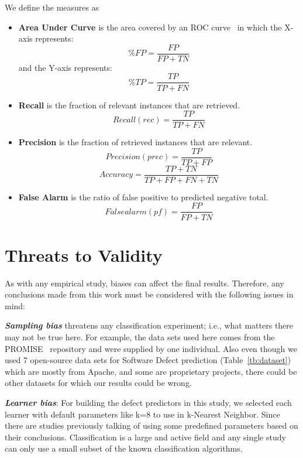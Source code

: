 \documentclass[sigconf,review, anonymous]{acmart}
\theoremstyle{break}
\begin{document}


We define the measures as
\begin{itemize}
\item \textbf{Area Under Curve} is the area covered by an ROC curve~\cite{swets1988measuring, duda2012pattern} in which the X-axis represents:
\[\%FP = \dfrac{FP}{FP + TN}\]
and the Y-axis represents:
\[\%TP = \dfrac{TP}{TP + FN}\]
\item \textbf{Recall}  is the fraction of relevant instances that are retrieved.
\[Recall(rec) = \dfrac{TP}{TP + FN}\]
\item \textbf{Precision} is the fraction of retrieved instances that are relevant.
\[Precision(prec) = \dfrac{TP}{TP + FP}\]
\[Accuracy = \dfrac{TP + TN}{TP + FP + FN + TN}\]
\item \textbf{False Alarm} is the ratio of false positive to predicted negative total.
\[False alarm(pf) = \dfrac{FP}{FP + TN}\]
\end{itemize}





\section{Threats to Validity}
\label{sect:validity}

As with any empirical study, biases can affect the final
results. Therefore, any conclusions made from this work must be considered with the following issues in mind:

\textbf{\textit{Sampling bias}} threatens any classification experiment; i.e., what matters there may not be true here. For example, the data sets used here comes from the PROMISE~\cite{promiserepo} repository and were supplied by one individual. Also even though we used 7 open-source data sets for Software Defect prediction (Table~\ref{tb:dataset}) which are mostly from Apache, and some are proprietary projects, there could be other datasets for which our results could be wrong.

\textbf{\textit{Learner bias}}: For building the defect predictors in this
study, we selected each learner with default parameters like k=8 to use in k-Nearest Neighbor. Since there are studies previously talking of using some predefined parameters based on their conclusions. Classification is a large and active field and any single study can only use a small subset of the known classification algorithms.
\end{document}
